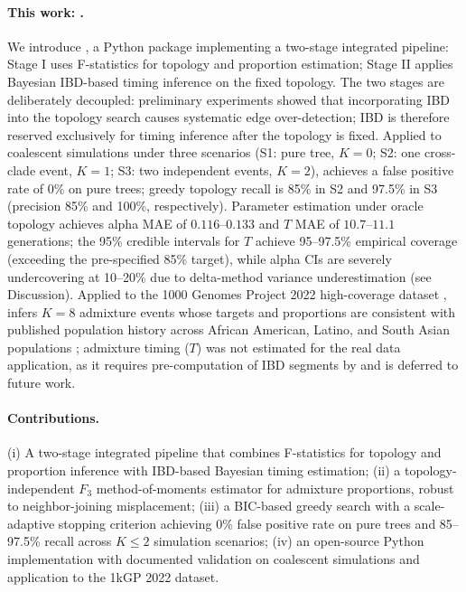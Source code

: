 \paragraph{This work: \hapgraph{}.}
We introduce \hapgraph{}, a Python package implementing a two-stage integrated
pipeline: Stage I uses F-statistics for topology and proportion estimation;
Stage II applies Bayesian IBD-based timing inference on the fixed topology.
The two stages are deliberately decoupled: preliminary experiments showed
that incorporating IBD into the topology search causes systematic edge
over-detection; IBD is therefore reserved exclusively for timing inference
after the topology is fixed.
Applied to coalescent simulations under three scenarios (S1: pure tree,
$K=0$; S2: one cross-clade event, $K=1$; S3: two independent events, $K=2$),
\hapgraph{} achieves a false positive rate of 0\% on pure trees; greedy
topology recall is 85\% in S2 and 97.5\% in S3 (precision 85\% and 100\%,
respectively).
Parameter estimation under oracle topology achieves alpha MAE of
$0.116$--$0.133$ and $T$ MAE of $10.7$--$11.1$ generations; the 95\%
credible intervals for $T$ achieve 95--97.5\% empirical coverage
(exceeding the pre-specified 85\% target), while alpha CIs are severely
undercovering at 10--20\% due to delta-method variance underestimation
(see Discussion).
Applied to the 1000 Genomes Project 2022 high-coverage dataset
\citep{ByrskaBishop2022}, \hapgraph{} infers $K=8$ admixture events whose
targets and proportions are consistent with published population history
across African American, Latino, and South Asian populations
\citep{Bryc2015,Moreno-Estrada2013,Moorjani2013};
admixture timing ($T$) was not estimated for the real data application,
as it requires pre-computation of IBD segments by \hapibd{} and is
deferred to future work.

\paragraph{Contributions.}
(i) A two-stage integrated pipeline that combines F-statistics for topology
and proportion inference with IBD-based Bayesian timing estimation;
(ii) a topology-independent $F_3$ method-of-moments estimator for admixture
proportions, robust to neighbor-joining misplacement;
(iii) a BIC-based greedy search with a scale-adaptive stopping criterion
achieving 0\% false positive rate on pure trees and 85--97.5\% recall
across $K \leq 2$ simulation scenarios;
(iv) an open-source Python implementation with documented validation on
coalescent simulations and application to the 1kGP 2022 dataset.
